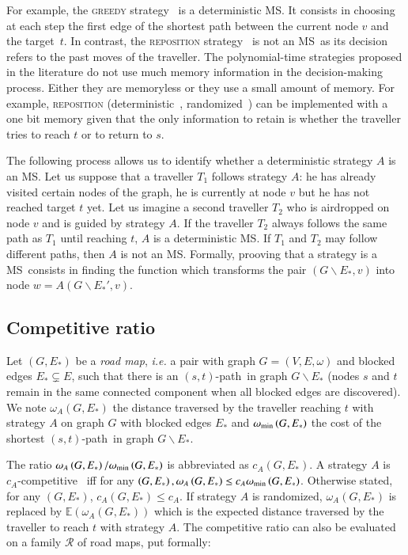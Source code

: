 \documentclass[preprint]{elsarticle}
\newcommand{\stpath}{$(s,t)$-path}
\newcommand{\omegamin}{\omega_{\mbox{\scriptsize{min}}}}
\newcommand{\mts}{MS}
\begin{document}
For example, the \textsc{greedy} strategy~\cite{XuHuSuZh09} is a deterministic \mts . It consists in choosing at each step the first edge of the shortest path between the current node $v$ and the target~$t$. 
In contrast, the \textsc{reposition} strategy~\cite{We08} is not an \mts ~as its decision refers to the past moves of the traveller. The polynomial-time strategies proposed in the literature do not use much memory information in the decision-making process. Either they are memoryless or they use a small amount of memory. For example, \textsc{reposition} (deterministic~\cite{We08}, randomized~\cite{BeWe15}) can be implemented with a  one bit memory given that the only information to retain is whether the traveller tries to reach $t$ or to return to $s$.

The following process allows us to identify whether a deterministic strategy $A$ is an \mts . Let us suppose that a traveller $T_1$ follows strategy $A$: he has already visited certain nodes of the graph, he is currently at node $v$ but he has not reached target $t$ yet. Let us imagine a second traveller $T_2$ who is airdropped on node $v$ and is guided by strategy $A$. If the traveller $T_2$ always follows the same path as $T_1$ until reaching $t$, $A$ is a deterministic \mts . If $T_1$ and $T_2$ may follow different paths, then $A$ is not an \mts . Formally, prooving that a strategy is a \mts ~consists in finding the function which transforms the pair $\left(G\backslash E_*,v\right)$ into node $w = A\left(G\backslash E_*',v\right)$.

\subsection{Competitive ratio} \label{subsec:compratio}

Let $\left(G,E_*\right)$ be a \textit{road map}, {\em i.e.} a pair with graph $G=\left(V,E,\omega\right)$ and blocked edges $E_* \subsetneq E$, such that there is an \stpath ~in graph $G\backslash E_*$ (nodes $s$ and $t$ remain in the same connected component when all blocked edges are discovered). We note $\omega_A\left(G,E_*\right)$ the distance traversed by the traveller reaching $t$ with strategy $A$ on graph $G$ with blocked edges $E_*$ and $\omegamin\left(G,E_*\right)$ the cost of the shortest \stpath ~in graph $G\backslash E_*$.

The ratio $\omega_A\left(G,E_*\right)/\omegamin\left(G,E_*\right)$ is abbreviated as $c_A\left(G,E_*\right)$. A strategy $A$ is $c_A$-competitive~\cite{BoEl98,XuHuSuZh09} iff for any $\left(G,E_*\right), \omega_A\left(G,E_*\right) \leq c_A \omegamin\left(G,E_*\right)$. Otherwise stated, for any $\left(G,E_*\right)$, $c_A\left(G,E_*\right) \leq c_A$. If strategy $A$ is randomized, $\omega_A\left(G,E_*\right)$ is replaced by $\mathbb{E}\left(\omega_A\left(G,E_*\right)\right)$ which is the expected distance traversed by the traveller to reach $t$ with strategy $A$. The competitive ratio can also be evaluated on a family $\mathcal{R}$ of road maps, put formally:
\end{document}
